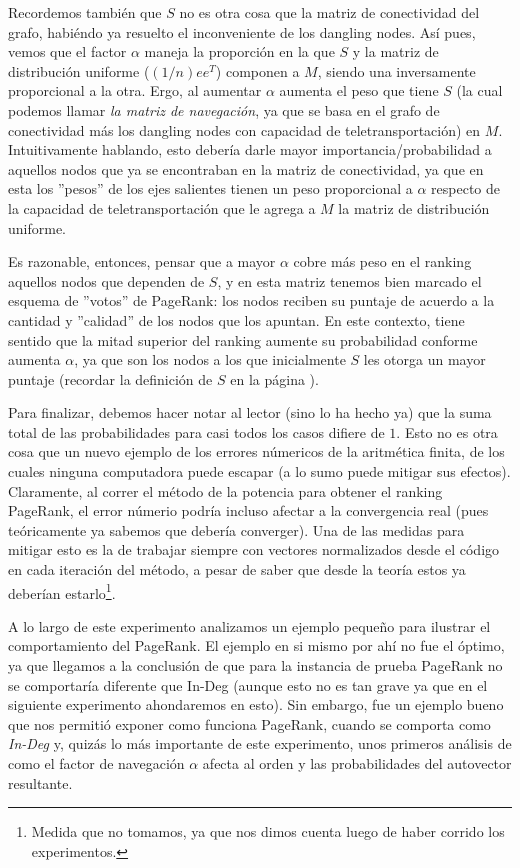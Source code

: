 \par Recordemos tambi\'en que $S$ no es otra cosa que la matriz de conectividad
del grafo, habi\'endo ya resuelto el inconveniente de los dangling nodes. As\'i
pues, vemos que el factor $\alpha$ maneja la proporci\'on en la que $S$ y la
matriz de distribuci\'on uniforme ($(1/n)ee^T$) componen a $M$, siendo una
inversamente proporcional a la otra. Ergo, al aumentar $\alpha$ aumenta el peso
que tiene $S$ (la cual podemos llamar \emph{la matriz de navegaci\'on}, ya que
se basa en el grafo de conectividad m\'as los dangling nodes con capacidad de
teletransportaci\'on) en $M$. Intuitivamente hablando, esto deber\'ia darle
mayor importancia/probabilidad a aquellos nodos que ya se encontraban en la
matriz de conectividad, ya que en esta los ''pesos'' de los ejes salientes
tienen un peso proporcional a $\alpha$ respecto de la capacidad de
teletransportaci\'on que le agrega a $M$ la matriz de distribuci\'on uniforme.

\par Es razonable, entonces, pensar que a mayor $\alpha$ cobre m\'as peso en el
ranking aquellos nodos que dependen de $S$, y en esta matriz tenemos bien
marcado el esquema de ''votos'' de PageRank: los nodos reciben su puntaje de
acuerdo a la cantidad y ''calidad'' de los nodos que los apuntan. En este
contexto, tiene sentido que la mitad superior del ranking aumente su
probabilidad conforme aumenta $\alpha$, ya que son los nodos a los que
inicialmente $S$ les otorga un mayor puntaje (recordar la definici\'on de $S$ en
la p\'agina \pageref{eq:S}).

\par Para finalizar, debemos hacer notar al lector (sino lo ha hecho ya) que la
suma total de las probabilidades para casi todos los casos difiere de $1$. Esto
no es otra cosa que un nuevo ejemplo de los errores n\'umericos de la
aritm\'etica finita, de los cuales ninguna computadora puede escapar (a lo sumo
puede mitigar sus efectos). Claramente, al correr el m\'etodo de la potencia
para obtener el ranking PageRank, el error n\'umerio podr\'ia incluso afectar a
la convergencia real (pues te\'oricamente ya sabemos que deber\'ia converger).
Una de las medidas para mitigar esto es la de trabajar siempre con vectores
normalizados desde el c\'odigo en cada iteraci\'on del m\'etodo, a pesar de
saber que desde la teor\'ia estos ya deber\'ian estarlo\footnote{Medida que no
tomamos, ya que nos dimos cuenta luego de haber corrido los experimentos.}.

\medskip
\par A lo largo de este experimento analizamos un ejemplo peque\~no para
ilustrar el comportamiento del PageRank. El ejemplo en si mismo por ah\'i no fue
el \'optimo, ya que llegamos a la conclusi\'on de que para la instancia de
prueba PageRank no se comportar\'ia diferente que In-Deg (aunque esto no es tan
grave ya que en el siguiente experimento ahondaremos en esto). Sin embargo, fue
un ejemplo bueno que nos permiti\'o exponer como funciona PageRank, cuando se
comporta como \emph{In-Deg} y, quiz\'as lo m\'as importante de este experimento,
unos primeros an\'alisis de como el factor de navegaci\'on $\alpha$ afecta al
orden y las probabilidades del autovector resultante.
